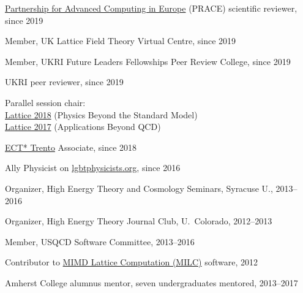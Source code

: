\documentclass[10 pt]{article}
\renewcommand{\section}[2]%
    {\pagebreak[2]\vspace{1.3\baselineskip}%
     \hspace{0in}%
     \marginpar{
     \raggedright \scshape #1}#2}
\newenvironment{tightlist}
  {\begin{list} {} {\setlength{\topsep}{-8 pt} \setlength{\itemsep}{-3 pt} \setlength{\leftmargin}{0 mm}}}{\end{list}}
\newcommand{\blankline}{\quad\pagebreak[2]}
\newcommand{\spacer}{\blankline\vspace{12 pt}\blankline}
\begin{document}
\vspace{-12 pt} %
\begin{tightlist}
  \item \href{http://www.prace-ri.eu}{Partnership for Advanced Computing in Europe} (PRACE) scientific reviewer, since 2019 %
  \item Member, UK Lattice Field Theory Virtual Centre, since 2019
  \item Member, UKRI Future Leaders Fellowships Peer Review College, since 2019 %
  \item UKRI peer reviewer, since 2019 %
  \item Parallel session chair:                                                                              \\
    \qquad \href{https://web.pa.msu.edu/conf/Lattice2018/}{Lattice 2018} (Physics Beyond the Standard Model) \\
    \qquad \href{http://wpd.ugr.es/~lattice2017/}{Lattice 2017} (Applications Beyond QCD)
  \item \href{http://www.ectstar.eu}{ECT* Trento} Associate, since 2018 %
  \item Ally Physicist on \href{http://lgbtphysicists.org}{lgbtphysicists.org}, since 2016 %
  \item Organizer, High Energy Theory and Cosmology Seminars, Syracuse U., 2013--2016
  \item Organizer, High Energy Theory Journal Club, U.~Colorado, 2012--2013
  \item Member, USQCD Software Committee, 2013--2016
  \item Contributor to \href{http://www.physics.utah.edu/~detar/milc/}{MIMD Lattice Computation (MILC)} software, 2012
  \item Amherst College alumnus mentor, seven undergraduates mentored, 2013--2017 %
\end{tightlist}

\spacer



\section{Additional training} %
\end{document}
